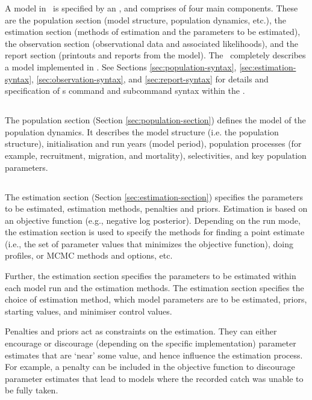 A model in \CNAME\ is specified by an \config, and comprises of four main components. These are the population section (model structure, population dynamics, etc.), the estimation section (methods of estimation and the parameters to be estimated), the observation section (observational data and associated likelihoods), and the report section (printouts and reports from the model). The \config\  completely describes a model implemented in \CNAME. See Sections \ref{sec:population-syntax}, \ref{sec:estimation-syntax}, \ref{sec:observation-syntax}, and \ref{sec:report-syntax} for details and specification of \CNAME s command and subcommand syntax within the \config. 

\subsection{}
\CH
The population section (Section \ref{sec:population-section}) defines the model of the population dynamics. It describes the model structure (i.e. the population structure), initialisation and run years (model period), population processes (for example, recruitment, migration, and mortality), selectivities, and key population parameters.

\subsection{}
\CH
The estimation section (Section \ref{sec:estimation-section}) specifies the parameters to be estimated, estimation methods, penalties and priors. Estimation is based on an objective function (e.g., negative log posterior). Depending on the run mode, the estimation section is used to specify the methods for finding a point estimate (i.e., the set of parameter values that minimizes the objective function), doing profiles, or MCMC methods and options, etc.

Further, the estimation section specifies the parameters to be estimated within each model run and the estimation methods. The estimation section specifies the choice of estimation method, which model parameters are to be estimated, priors, starting values, and minimiser control values.

Penalties and priors act as constraints on the estimation. They can either encourage or discourage (depending on the specific implementation) parameter estimates that are `near' some value, and hence influence the estimation process. For example, a penalty can be included in the objective function to discourage parameter estimates that lead to models where the recorded catch was unable to be fully taken.

